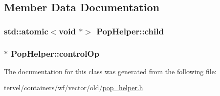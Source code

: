 \subsection{Member Data Documentation}
\hypertarget{class_pop_helper_a4dec73ec5d4d34f54634b18c325262b3}{}
\subsubsection[{child}]{\setlength{\rightskip}{0pt plus 5cm}std\+::atomic$<$void $\ast$$>$ Pop\+Helper\+::child}\label{class_pop_helper_a4dec73ec5d4d34f54634b18c325262b3}
\hypertarget{class_pop_helper_a8997d99ba6a2a7449d2fcf4ed6e99340}{}
\subsubsection[{control\+Op}]{$\ast$ Pop\+Helper\+::control\+Op}\label{class_pop_helper_a8997d99ba6a2a7449d2fcf4ed6e99340}


The documentation for this class was generated from the following file\+:\begin{DoxyCompactItemize}
\item 
tervel/containers/wf/vector/old/\hyperlink{pop__helper_8h}{pop\+\_\+helper.\+h}\end{DoxyCompactItemize}
